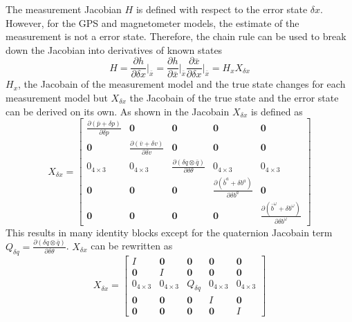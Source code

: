 The measurement Jacobian $H$ is defined with respect to the error state $\delta x$. However, for the GPS and magnetometer models, the estimate of the measurement is not a error state. Therefore, the chain rule can be used to break down the Jacobian into derivatives of known states \cite{Quaternion_Kinematics_for_the_Error-state_EKF}
\begin{equation}
    H = \frac{\partial h}{\partial \delta x} \bigg|_{\bar{x}} = \frac{\partial h}{\partial \bar{x}} \bigg|_{\bar{x}} \frac{\partial \bar{x}}{\partial \delta x} \bigg|_{\bar{x}} = H_x X_{\delta x}
    \label{eq: H quaternion}
\end{equation}
$H_x$, the Jacobain of the measurement model and the true state changes for each measurement model but $X_{\delta x}$ the Jacobain of the true state and the error state can be derived on its own. As shown in \cite{Quaternion_Kinematics_for_the_Error-state_EKF} the Jacobain $X_{\delta x}$ is defined as
\begin{equation}
    X_{\delta x} = \begin{bmatrix}
    \frac{\partial (\bar{p} + \delta p)}{\partial \delta p} & \mathbf{0} & \mathbf{0} & \mathbf{0} & \mathbf{0}\\
    \mathbf{0} & \frac{\partial (\bar{v} + \delta v)}{\partial \delta v} & \mathbf{0} & \mathbf{0} & \mathbf{0}\\
    0_{4 \times 3} & 0_{4 \times 3} & \frac{\partial (\delta q \otimes \bar{q})}{\partial \delta \theta} & 0_{4 \times 3} & 0_{4 \times 3}\\
    \mathbf{0} & \mathbf{0} & \mathbf{0} & \frac{\partial (\bar{b}^a + \delta b^a)}{\partial \delta b^a} & \mathbf{0} \\
    \mathbf{0} & \mathbf{0} & \mathbf{0} & \mathbf{0} & \frac{\partial (\bar{b}^{\omega} + \delta b^{\omega})}{\partial \delta b^{\omega}}
    \end{bmatrix}
    \label{eq:X_delta_x}
\end{equation}
This results in many identity blocks except for the quaternion Jacobain term $Q_{\delta q} = \frac{\partial (\delta q \otimes \bar{q})}{\partial \delta \theta}$. $X_{\delta x}$ can be rewritten as
\begin{equation}
    X_{\delta x} = \begin{bmatrix}
    I & \mathbf{0} & \mathbf{0} & \mathbf{0} & \mathbf{0}\\
    \mathbf{0} & I & \mathbf{0} & \mathbf{0} & \mathbf{0}\\
    0_{4 \times 3} & 0_{4 \times 3} & Q_{\delta q} & 0_{4 \times 3} & 0_{4 \times 3}\\
    \mathbf{0} & \mathbf{0} & \mathbf{0} & I & \mathbf{0} \\
    \mathbf{0} & \mathbf{0} & \mathbf{0} & \mathbf{0} & I
    \end{bmatrix}
    \label{eq:X_delta_x_simplified}
\end{equation}

